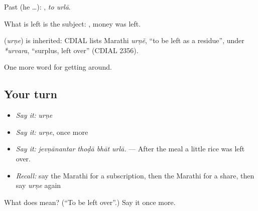 Past (he …):  , \emph{to urlā}.

What is left is the subject:  , money was left.

\begin{cousinweb}
\textbf{} (\emph{urṇe}) is inherited: CDIAL lists Marathi \emph{urṇẽ}, \textquotedblleft{}to be left as a residue\textquotedblright{}, under \emph{*urvara}, \textquotedblleft{}surplus, left over\textquotedblright{} (CDIAL 2356).
\end{cousinweb}

\begin{grammarlens}[title={What you've built}]
One more word for getting around.
\end{grammarlens}

\subsection*{Your turn}
\begin{itemize}
\raggedright
  \item \emph{Say it:} \emph{urṇe}
  \item \emph{Say it:} \emph{urṇe}, once more
  \item \emph{Say it:} \emph{jevṇānantar thoḍā bhāt urlā.} — After the meal a little rice was left over.
  \item \emph{Recall:} say the Marathi for a subscription, then the Marathi for a share, then say \emph{urṇe} again
\end{itemize}

\begin{tcolorbox}[breakable,colback=teal!4,colframe=teal!35!black,title={Before you move on}]
What does  mean? (\textquotedblleft{}To be left over\textquotedblright{}.) Say it once more.
\end{tcolorbox}
